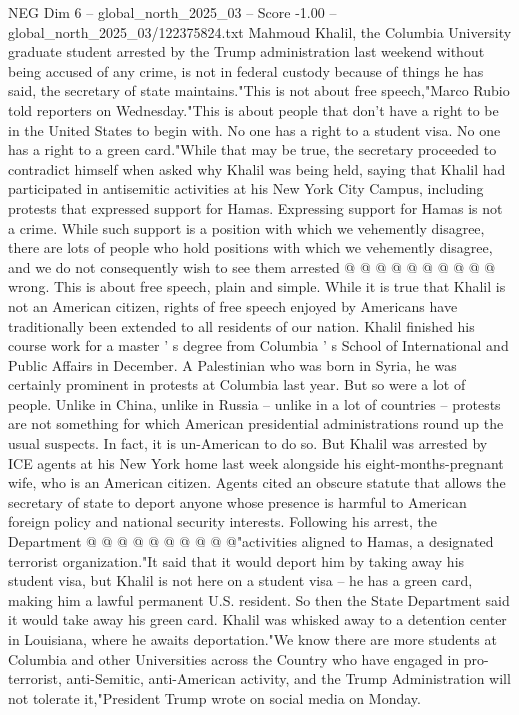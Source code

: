 \begin{textsample}{NEG Dim 6 – global\_north\_2025\_03 – Score -1.00 – global\_north\_2025\_03/122375824.txt}  \label{ex:f6_neg_232}
Mahmoud Khalil, the Columbia University graduate student arrested by the Trump administration last weekend without being accused of any crime, is not in federal custody because of things he has said, the secretary of state maintains."This is not about free speech,"Marco Rubio told reporters on Wednesday."This is about people that don't have a right to be in the United States to begin with.
No one has a right to a student visa.
No one has a right to a green card."While that may be true, the secretary proceeded to contradict himself when asked why Khalil was being held, saying that Khalil had participated in antisemitic activities at his New York City Campus, including protests that expressed support for Hamas.
Expressing support for Hamas is not a crime.
While such support is a position with which we vehemently disagree, there are lots of people who hold positions with which we vehemently disagree, and we do not consequently wish to see them arrested @ @ @ @ @ @ @ @ @ @ wrong.
This is about free speech, plain and simple.
While it is true that Khalil is not an American citizen, rights of free speech enjoyed by Americans have traditionally been extended to all residents of our nation.
Khalil finished his course work for a master ' s degree from Columbia ' s School of International and Public Affairs in December.
A Palestinian who was born in Syria, he was certainly prominent in protests at Columbia last year.
But so were a lot of people.
Unlike in China, unlike in Russia -- unlike in a lot of countries -- protests are not something for which American presidential administrations round up the usual suspects.
In fact, it is un-American to do so.
But Khalil was arrested by ICE agents at his New York home last week alongside his eight-months-pregnant wife, who is an American citizen.
Agents cited an obscure statute that allows the secretary of state to deport anyone whose presence is harmful to American foreign policy and national security interests.
Following his arrest, the Department @ @ @ @ @ @ @ @ @ @"activities aligned to Hamas, a designated terrorist organization."It said that it would deport him by taking away his student visa, but Khalil is not here on a student visa -- he has a green card, making him a lawful permanent U.S. resident.
So then the State Department said it would take away his green card.
Khalil was whisked away to a detention center in Louisiana, where he awaits deportation."We know there are more students at Columbia and other Universities across the Country who have engaged in pro-terrorist, anti-Semitic, anti-American activity, and the Trump Administration will not tolerate it,"President Trump wrote on social media on Monday.

\end{textsample}
